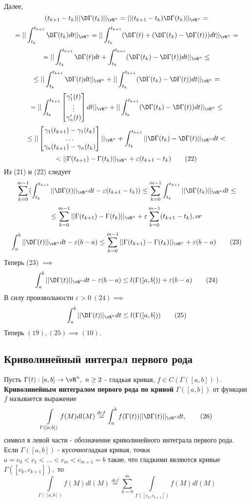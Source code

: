 \documentclass[main]{subfiles}
\begin{document}
\begin{longProof}
    Далее, \[ (t_{k+1}-t_k)||\D\Gamma(t_k)||_{\vR^n}=||(t_{k+1}-t_k)\D\Gamma(t_k)||_{\vR^n}= \]
    \[ =||\int_{t_k}^{t_{k+1}}\D\Gamma(t_k)dt||_{\vR^n}=||\int_{t_k}^{t_{k+1}}(\D\Gamma(t)+(\D\Gamma(t_k)-\D\Gamma(t)))dt||_{\vR^n}= \]
    \[ =||\int_{t_k}^{t_{k+1}}\D\Gamma(t)dt+\int_{t_k}^{t_{k+1}}(\D\Gamma(t_k)-\D\Gamma(t))dt||_{\vR^n}\leq \]
    \[ \leq ||\int_{t_k}^{t_{k+1}}\D\Gamma(t)dt||_{\vR^n}+||\int_{t_k}^{t_{k+1}}(\D\Gamma(t_k)-\D\Gamma(t))dt||_{\vR^n}=\]
    \[ =||\int_{t_k}^{t_{k+1}} \begin{bmatrix}\gamma'_1(t)\\\vdots\\\gamma'_n(t)\end{bmatrix}dt||_{\vR^n}+||\int_{t_k}^{t_{k+1}}(\D\Gamma(t_k)-\D\Gamma(t))dt||_{\vR^n}\leq\]
    \[ \leq||\begin{bmatrix}\gamma_1(t_{k+1})-\gamma_1(t_k)\\\dots\\\gamma_n(t_{k+1})-\gamma_n(t_k)\end{bmatrix}||_{\vR^n}+\int_{t_k}^{t_{k+1}}||\D\Gamma(t_k)-\D\Gamma(t)||_{\vR^n} dt< \]
    \[ <||\Gamma(t_{k+1})-\Gamma(t_k)||_{\vR^n}+\varepsilon(t_{k+1}-t_k)\tag{22} \]
    Из (21) и (22) следует
    \[\sum\limits_{k=0}^{m-1}(\int_{t_k}^{t_{k+1}}||\D\Gamma(t)||_{\vR^n} dt-\varepsilon(t_{k+1}-t_k))\leq\sum\limits_{k=0}^{m-1}\int_{t_k}^{t_{k+1}}||\D\Gamma(t_k)||_{\vR^n} dt\leq \]
    \[ \leq \sum\limits_{k=0}^{m-1}||\Gamma(t_{k+1})-\Gamma(t_k)||_{\vR^n}+\varepsilon\sum_{k=0}^{m-1}(t_{k+1}-t_k), or \]
    \[ \int_a^b||\D\Gamma(t)||_{\vR^n} dt-\varepsilon(b-a)\leq \sum\limits_{k=0}^{m-1}||\Gamma(t_{k+1})-\Gamma(t_k)||_{\vR^n}+\varepsilon(b-a)\tag{23} \]
    Теперь (23) $\implies$
    \[ \int_a^b||\D\Gamma(t)||_{\vR^n} dt-\varepsilon(b-a)\leq l(\Gamma([a,b]))+\varepsilon(b-a)\tag{24} \]
    В силу произвольности $\varepsilon>0\ (24) \implies$
    \[ \int_a^b||\D\Gamma(t)||_{\vR^n} dt\leq l(\Gamma([a,b]))\tag{25} \]
    Теперь $(19), (25)\implies (10).$
\end{longProof}

\subsection{Криволинейный интеграл первого рода}
\begin{definition}
    Пусть $\Gamma(t):[a,b]\rightarrow{\vR^n},\ n\geq 2$ - гладкая кривая, $f\in C(\Gamma([a,b])).$ \\
    \textbf{Криволинейным интегралом первого рода по кривой} $\Gamma([a,b])$ от функции $f$ называется выражение
    \[ \int\limits_{\Gamma([a,b])} f(M)dl(M)\overset{def}{=}\int_a^b f(\Gamma(t))||\D\Gamma(t)||_{\vR^n} dt,\tag{26} \]
    символ в левой части - обозначение криволинейного интеграла первого рода.\\
    Если $\Gamma([a,b])$ - кусочногладкая кривая, точки $a=c_0<c_1<\dots<c_m<c_{m+1}=b$ такие, что гладкими являются кривые
    $\Gamma([c_k,c_{k+1}]),$ то \[ \int\limits_{\Gamma([a,b])} f(M)dl(M)\overset{def}{=}\sum\limits_{k=0}^m \int\limits_{\Gamma([c_k,c_{k+1}])} f(M)dl(M) \]
\end{definition}
\end{document}
